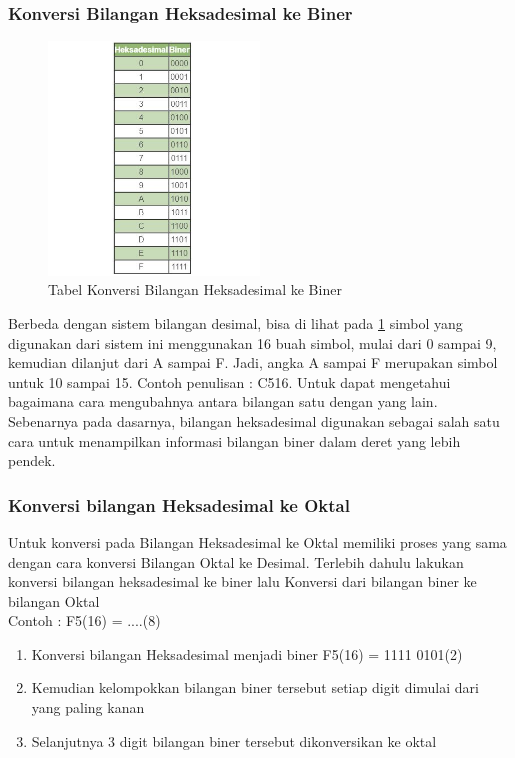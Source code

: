 \subsubsection{Konversi Bilangan Heksadesimal ke Biner}
\begin{figure}[ht]
\centerline{\includegraphics[width=0.5\textwidth]{figures/konversiheksa.JPG}}
\caption{Tabel Konversi Bilangan Heksadesimal ke Biner}
\label{heksakebiner}
\end{figure}
Berbeda dengan sistem bilangan desimal, bisa di lihat pada \ref{heksakebiner} simbol yang digunakan dari sistem ini menggunakan 16 buah simbol, mulai dari 0 sampai 9, kemudian dilanjut dari A sampai F. Jadi, angka A sampai F merupakan simbol untuk 10 sampai 15. Contoh penulisan : C516.
Untuk dapat mengetahui bagaimana cara mengubahnya antara bilangan satu dengan yang lain. Sebenarnya pada dasarnya, bilangan heksadesimal digunakan sebagai salah satu cara untuk menampilkan informasi bilangan biner dalam deret yang lebih pendek.

\subsubsection{Konversi bilangan Heksadesimal ke Oktal}
Untuk konversi pada Bilangan Heksadesimal ke Oktal memiliki proses yang sama dengan cara konversi Bilangan Oktal ke Desimal. Terlebih dahulu lakukan konversi bilangan heksadesimal ke biner lalu Konversi dari bilangan biner ke bilangan Oktal
\\Contoh : F5(16) = ....(8)
\begin{enumerate}
\item Konversi bilangan Heksadesimal menjadi biner F5(16) = 1111 0101(2)
\item Kemudian kelompokkan bilangan biner tersebut setiap digit dimulai dari yang paling kanan
\item Selanjutnya 3 digit bilangan biner tersebut dikonversikan ke oktal
\end{enumerate}

